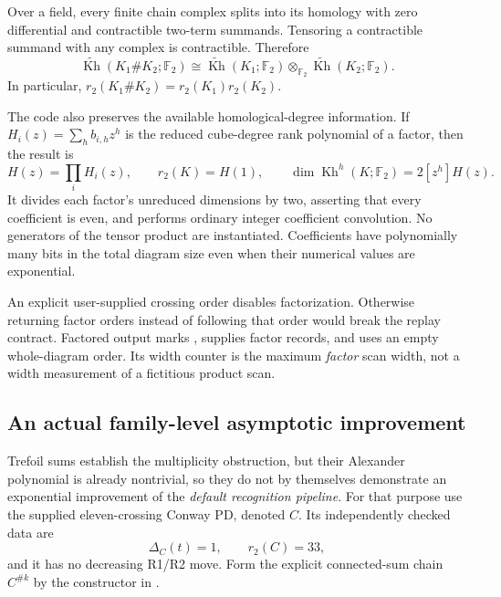 \documentclass[11pt]{article}
\newcommand{\F}{\mathbb F}
\newcommand{\Kh}{\operatorname{Kh}}
\newcommand{\rKh}{\widetilde{\operatorname{Kh}}}
\newcommand{\code}[1]{\texttt{\detokenize{#1}}}
\begin{document}
Over a field, every finite chain complex splits into its homology with zero
differential and contractible two-term summands. Tensoring a contractible
summand with any complex is contractible. Therefore
\begin{equation}\label{eq:sum}
 \rKh(K_1\#K_2;\F_2)
 \cong \rKh(K_1;\F_2)\otimes_{\F_2}\rKh(K_2;\F_2).
\end{equation}
In particular, $r_2(K_1\#K_2)=r_2(K_1)r_2(K_2)$.

The code also preserves the available homological-degree information. If
$H_i(z)=\sum_h b_{i,h}z^h$ is the reduced cube-degree rank polynomial of a
factor, then the result is
\[
 H(z)=\prod_i H_i(z),\qquad
 r_2(K)=H(1),\qquad
 \dim\Kh^h(K;\F_2)=2[z^h]H(z).
\]
It divides each factor's unreduced dimensions by two, asserting that every
coefficient is even, and performs ordinary integer coefficient convolution.
No generators of the tensor product are instantiated. Coefficients have
polynomially many bits in the total diagram size even when their numerical
values are exponential.

An explicit user-supplied crossing order disables factorization. Otherwise
returning factor orders instead of following that order would break the replay
contract. Factored output marks \code{factorized=true}, supplies factor records,
and uses an empty whole-diagram order. Its width counter is the maximum
\emph{factor} scan width, not a width measurement of a fictitious product scan.

\subsection{An actual family-level asymptotic improvement}

Trefoil sums establish the multiplicity obstruction, but their Alexander
polynomial is already nontrivial, so they do not by themselves demonstrate an
exponential improvement of the \emph{default recognition pipeline}. For that
purpose use the supplied eleven-crossing Conway PD, denoted $C$.
Its independently checked data are
\[
 \Delta_C(t)=1,\qquad r_2(C)=33,
\]
and it has no decreasing R1/R2 move. Form the explicit connected-sum chain
$C^{\#k}$ by the constructor in \code{benchmarks/common.py}.
\end{document}
